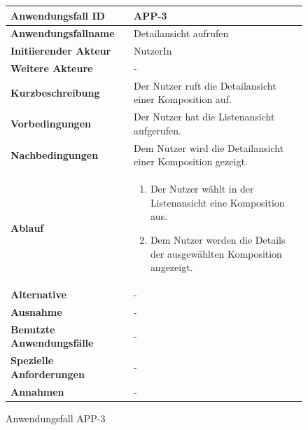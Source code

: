\begin{figure}[h]
	\centering
	\begin{tabularx}{\textwidth}{ X | X }
		\textbf{Anwendungsfall ID} & APP-3 \\ \hline
		\textbf{Anwendungsfallname} & Detailansicht aufrufen \\ \hline
		\textbf{Initiierender Akteur} & NutzerIn \\ \hline
		\textbf{Weitere Akteure} & -  \\ \hline
		\textbf{Kurzbeschreibung} & Der Nutzer ruft die Detailansicht einer Komposition auf.  \\ \hline
		\textbf{Vorbedingungen} & Der Nutzer hat die Listenansicht aufgerufen.  \\ \hline
		\textbf{Nachbedingungen} & Dem Nutzer wird die Detailansicht einer Komposition gezeigt.  \\ \hline
		\textbf{Ablauf} &
		\begin{enumerate}
			\item Der Nutzer wählt in der Listenansicht eine Komposition aus.
			\item Dem Nutzer werden die Details der ausgewählten Komposition angezeigt.
		\end{enumerate} \\ \hline
		\textbf{Alternative} &
		-  \\ \hline
		\textbf{Ausnahme} &
		- \\ \hline
		\textbf{Benutzte Anwendungsfälle} & - \\ \hline
		\textbf{Spezielle Anforderungen} & - \\ \hline
		\textbf{Annahmen} & -
	\end{tabularx}
	\caption{Anwendungsfall APP-3}
	\label{fig:anwendungsfall-app-tabelle-APP-3}
\end{figure}

\newpage


